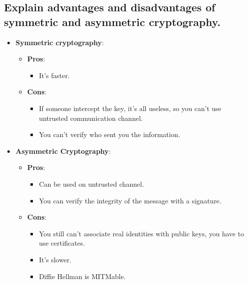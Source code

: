 \documentclass[9pt, letterpaper]{article}
\begin{document}
\subsection{Explain advantages and disadvantages of symmetric and asymmetric cryptography.}
\begin{itemize}
	\item \textbf{Symmetric cryptography}:
	\begin{itemize}
		\item \textbf{Pros}:
		\begin{itemize}
			\item It's faster.
		\end{itemize}
		\item \textbf{Cons}:
		\begin{itemize}
			\item If someone intercept the key, it's all useless, so you can't use untrusted communication channel.
			\item You can't verify who sent you the information.
		\end{itemize}
	\end{itemize}
	\item \textbf{Asymmetric Cryptography}:
		\begin{itemize}
		\item \textbf{Pros}:
		\begin{itemize}
			\item Can be used on untrusted channel.
			\item You can verify the integrity of the message with a signature.
		\end{itemize}
		\item \textbf{Cons}:
		\begin{itemize}
			\item You still can't associate real identities with public keys, you have to use certificates.
			\item It's slower.
			\item Diffie Hellman is MITMable.
		\end{itemize}
	\end{itemize}
\end{itemize}
\end{document}
